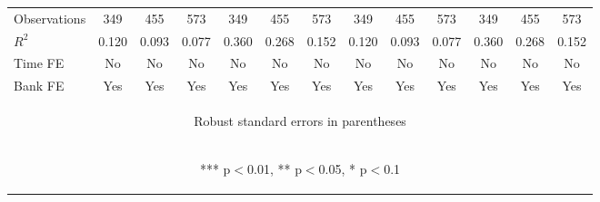 \documentclass[]{article}
\begin{document}
\begin{center}
\begin{tabular}{lcccccccccccc}
Observations & 349 & 455 & 573 & 349 & 455 & 573 & 349 & 455 & 573 & 349 & 455 & 573 \\
$R^2$ & 0.120 & 0.093 & 0.077 & 0.360 & 0.268 & 0.152 & 0.120 & 0.093 & 0.077 & 0.360 & 0.268 & 0.152 \\
Time FE & No & No & No & No & No & No & No & No & No & No & No & No \\
 Bank FE & Yes & Yes & Yes & Yes & Yes & Yes & Yes & Yes & Yes & Yes & Yes & Yes \\ \hline
\multicolumn{13}{c}{\begin{footnotesize} Robust standard errors in parentheses\end{footnotesize}} \\
\multicolumn{13}{c}{\begin{footnotesize} *** p$<$0.01, ** p$<$0.05, * p$<$0.1\end{footnotesize}} \\
\end{tabular}
\end{center}
\end{document}

